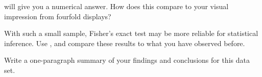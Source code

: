 \documentclass[10pt]{report}\usepackage[]{graphicx}\usepackage[]{color}
\begin{document}
\begin{Exercises}
\begin{enumerate*}
    \item {} will give you a numerical answer.  How does
    this compare to your visual impression from fourfold displays?
    \begin{ans}
    \end{ans}
    
    \item With such a small sample, Fisher's exact test may be more reliable for statistical
    inference.  Use , and compare these results to what you have
    observed before.
    \begin{ans}
    \end{ans}
    
    \item Write a one-paragraph summary of your findings and conclusions for this data set.
    \begin{ans}
    \end{ans}
    
  \end{enumerate*}


\end{Exercises}
\end{document}

